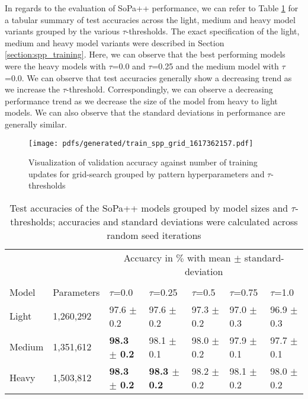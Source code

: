 In regards to the evaluation of SoPa++ performance, we can refer to Table
\ref{tab:results_evaluation} for a tabular summary of test accuracies across the
light, medium and heavy model variants grouped by the various $\tau$-thresholds.
The exact specification of the light, medium and heavy model variants were
described in Section \ref{section:spp_training}. Here, we can observe that the
best performing models were the heavy models with $\tau$=0.0 and $\tau$=0.25
and the medium model with $\tau$=0.0. We can observe that test accuracies
generally show a decreasing trend as we increase the $\tau$-threshold.
Correspondingly, we can observe a decreasing performance trend as we decrease
the size of the model from heavy to light models. We can also observe that the
standard deviations in performance are generally similar.

\begin{figure}[t!]
  \centering
  \texttt{[image: pdfs/generated/train\_spp\_grid\_1617362157.pdf]}
  \caption{Visualization of validation accuracy against number of training
    updates for grid-search grouped by pattern hyperparameters and $\tau$-thresholds}
  \label{fig:results_training}
\end{figure}

\begin{table}[t!]
  \centering {}
  \small
  \begin{tabular}{lllllll}
    \toprule
    && \multicolumn{5}{c}{Accuarcy in $\%$ with mean $\pm$ standard-deviation} \\
    \cline{3-7} \\[-10pt]
    Model & Parameters & $\tau$=0.0 & $\tau$=0.25 & $\tau$=0.5 & $\tau$=0.75 & $\tau$=1.0 \\
    \midrule
    Light & 1,260,292 & 97.6 $\pm$ 0.2 & 97.6 $\pm$ 0.2 & 97.3 $\pm$ 0.2 & 97.0 $\pm$ 0.3 & 96.9 $\pm$ 0.3 \\
    Medium & 1,351,612 & \textbf{98.3 $\bm{\pm}$ 0.2} & 98.1 $\pm$ 0.1 & 98.0 $\pm$ 0.2 & 97.9 $\pm$ 0.1 & 97.7 $\pm$ 0.1  \\
    Heavy & 1,503,812 & \textbf{98.3 $\bm{\pm}$ 0.2} & \textbf{98.3 $\bm{\pm}$ 0.2} & 98.2 $\pm$ 0.2 & 98.1 $\pm$ 0.2 & 98.0 $\pm$ 0.2 \\
    \bottomrule
  \end{tabular}
  \caption{Test accuracies of the SoPa++ models grouped by model sizes and
    $\tau$-thresholds; accuracies and standard deviations were calculated across
  random seed iterations}
  \label{tab:results_evaluation}
\end{table}

